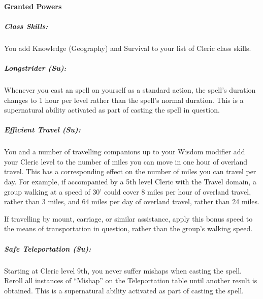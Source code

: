 \paragraph{Granted Powers}
\subparagraph{Class Skills:} 
You add Knowledge (Geography) and Survival to your list of Cleric class skills.
\subparagraph{Longstrider (Su):}
Whenever you cast an  spell on yourself as a standard action, the spell's duration changes to 1 hour per level rather than the spell's normal duration.
This is a supernatural ability activated as part of casting the spell in question.
\subparagraph{Efficient Travel (Su):}
You and a number of travelling companions up to your Wisdom modifier add your Cleric level to the number of miles you can move in one hour of overland travel.
This has a corresponding effect on the number of miles you can travel per day.
For example, if accompanied by a 5th level Cleric with the Travel domain, a group walking at a speed of 30' could cover 8 miles per hour of overland travel, rather than 3 miles, and 64 miles per day of overland travel, rather than 24 miles.

If travelling by mount, carriage, or similar assistance, apply this bonus speed to the means of transportation in question, rather than the group's walking speed.
\subparagraph{Safe Teleportation (Su):}
Starting at Cleric level 9th, you never suffer mishaps when casting the  spell.
Reroll all instances of ``Mishap'' on the Teleportation table until another result is obtained.
This is a supernatural ability activated as part of casting the spell.
